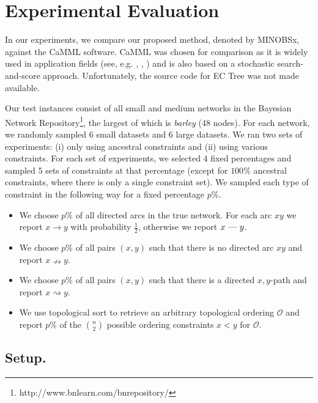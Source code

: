 \documentclass[twoside,11pt]{article}
\begin{document}
\section{Experimental Evaluation}
\label{SECTION:Experimental}

In our experiments, we compare our proposed method, denoted by MINOBSx, against the CaMML software. CaMML was chosen for comparison as it is widely
used in application fields (see, e.g. \cite{Flores2011}, \cite{Kennett2001}, \cite{Sesen2013}) and is also based on a stochastic search-and-score approach. 
Unfortunately, the source code for EC Tree was not made available.

\medskip
Our test instances consist of all small and medium networks in the Bayesian Network Repository\footnote{http://www.bnlearn.com/bnrepository/}, the largest of 
which is \emph{barley} (48 nodes). For each network, we randomly sampled 6 small datasets and 6 large datasets. We ran two sets of experiments: 
(i) only using ancestral constraints and (ii) using various constraints. For each set of experiments, we selected 4 fixed percentages and sampled 5 sets of constraints
at that percentage (except for $100\%$ ancestral constraints, where there is only a single constraint set). We sampled each type of constraint in the following way
for a fixed percentage $p\%$. 

\begin{itemize}
\item We choose $p\%$ of all directed arcs in the true network. For each arc $xy$ we report $x \rightarrow y$ with probability $\frac{1}{2}$, otherwise we report 
$x \text{ \textemdash \  } y$.

\item We choose $p\%$ of all pairs $(x, y)$ such that there is no directed arc $xy$ and report $x \nrightarrow y$. 

\item We choose $p\%$ of all pairs $(x, y)$ such that there is a directed $x, y$-path and report $x \rightsquigarrow y$.

\item We use topological sort to retrieve an arbitrary topological ordering $\mathcal{O}$ and report $p\%$ of the $n \choose 2$ possible ordering constraints $x < y$ for
$\mathcal{O}$. 

\end{itemize}

\subsection{Setup.}
\end{document}
